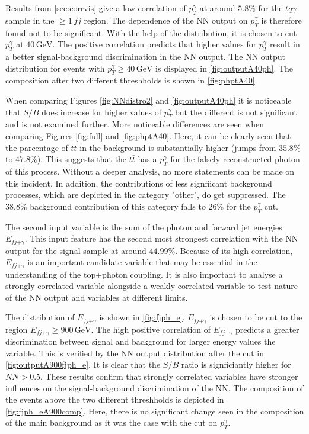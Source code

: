 Results from \autoref{sec:corrvis} give a low correlation of $p_T^\gamma$ at around $5.8\%$ for the $tq\gamma$ sample in the $\geq 1\, fj$ region. The dependence of the NN output on $p_T^\gamma$ is therefore found not to be significant. 
With the help of the distribution, it is chosen to cut $p_T^\gamma$ at $40\,\si{\giga\electronvolt}$. The positive correlation predicts that higher values for $p_T^\gamma$ result in a better signal-background discrimination in the NN output. 
The NN output distribution for events with $p_T^\gamma \geq 40\,\si{\giga\electronvolt}$ is displayed in \autoref{fig:outputA40ph}. The composition after two different threshholds is shown in \autoref{fig:phptA40}.

When comparing Figures \ref{fig:NNdistro2} and \ref{fig:outputA40ph} it is noticeable that $S/B$ does increase for higher values of $p_T^\gamma$ but the different is not significant and is not examined further. 
More noticeable differences are seen when comparing Figures \ref{fig:full} and \ref{fig:phptA40}. Here, it can be clearly seen that the parcentage of $t\bar{t}$ in the background is substantially higher (jumps from $35.8\%$ to $47.8\%$). 
This suggests that the $t\bar{t}$ has a $p_T^\gamma$ for the falsely reconstructed photon of this process. Without a deeper analysis, no more statements can be made on this incident. 
In addition, the contributions of less signfiicant background processes, which are depicted in the category "other", do get suppressed. The $38.8\%$ background contribution of this category falls to $26\%$ for the $p_T^\gamma$ cut.

The second input variable is the sum of the photon and forward jet energies $E_{fj\text{+}\gamma}$. This input feature has the second most strongest correlation with the NN output for the signal sample at around $44.99\%$. 
Because of its high correlation, $E_{fj\text{+}\gamma}$ is an important candidate variable that may be essential in the understanding of the top+photon coupling. It is also important to analyse a strongly correlated variable alongside a weakly correlated variable to test nature of the NN output and variables at different limits.

The distribution of $E_{fj\text{+}\gamma}$ is shown in \autoref{fig:fjph_e}. $E_{fj\text{+}\gamma}$ is chosen to be cut to the region $E_{fj\text{+}\gamma} \geq 900\,\si{\giga\electronvolt}$. 
The high positive correlation of $E_{fj\text{+}\gamma}$ predicts a greater discrimination between signal and background for larger energy values the variable. This is verified by the NN output distribution after the cut in 
\autoref{fig:outputA900fjph_e}. It is clear that the $S/B$ ratio is signficiantly higher for $NN > 0.5$. These results confirm that strongly correlated variables have stronger influences on the signal-background discrimination of the NN.
The composition of the events above the two different threshholds is depicted in \autoref{fig:fjph_eA900comp}. Here, there is no significant change seen in the composition of the main background as it was the case with the cut on $p_T^\gamma$. 

